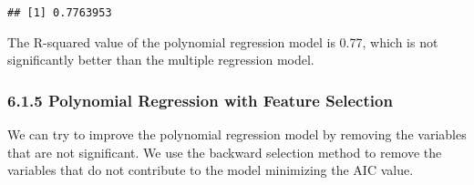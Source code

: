 \documentclass[
]{article}
\newenvironment{Shaded}{\begin{snugshade}}{\end{snugshade}}
\newcommand{\AttributeTok}[1]{\textcolor[rgb]{0.13,0.29,0.53}{#1}}
\newcommand{\ConstantTok}[1]{\textcolor[rgb]{0.56,0.35,0.01}{#1}}
\newcommand{\DecValTok}[1]{\textcolor[rgb]{0.00,0.00,0.81}{#1}}
\newcommand{\FunctionTok}[1]{\textcolor[rgb]{0.13,0.29,0.53}{\textbf{#1}}}
\newcommand{\NormalTok}[1]{#1}
\newcommand{\OtherTok}[1]{\textcolor[rgb]{0.56,0.35,0.01}{#1}}
\newcommand{\SpecialCharTok}[1]{\textcolor[rgb]{0.81,0.36,0.00}{\textbf{#1}}}
\begin{document}
\begin{Shaded}
\end{Shaded}

\begin{verbatim}
## [1] 0.7763953
\end{verbatim}

The R-squared value of the polynomial regression model is 0.77, which is
not significantly better than the multiple regression model.

\hypertarget{polynomial-regression-with-feature-selection}{%
\subsubsection{6.1.5 Polynomial Regression with Feature
Selection}\label{polynomial-regression-with-feature-selection}}

We can try to improve the polynomial regression model by removing the
variables that are not significant. We use the backward selection method
to remove the variables that do not contribute to the model minimizing
the AIC value.
\end{document}
